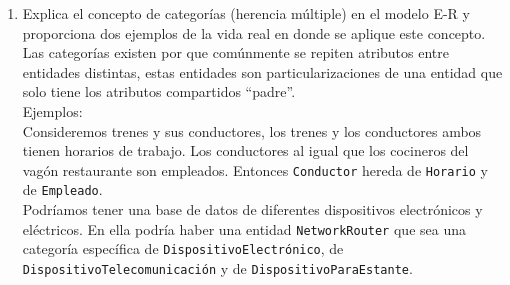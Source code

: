 \documentclass[12pt,a4paper]{article}
\begin{document}
\begin{enumerate}
\begin{enumerate}
			\item Explica el concepto de categorías (herencia múltiple) en el modelo E-R
				y proporciona dos ejemplos de la vida real en donde se aplique este concepto.\\

				Las categorías existen por que comúnmente se repiten atributos entre
				entidades distintas, estas entidades son particularizaciones de una entidad
				que solo tiene los atributos compartidos ``padre''.\\

				Ejemplos:\\
				Consideremos trenes y sus conductores, los trenes y los
				conductores ambos tienen horarios de trabajo. Los conductores
				al igual que los cocineros del vagón restaurante son empleados.
				Entonces \texttt{Conductor} hereda de \texttt{Horario} y de \texttt{Empleado}.\\

				Podríamos tener una base de datos de diferentes dispositivos electrónicos y eléctricos.
				En ella podría haber una entidad \texttt{NetworkRouter} que sea una categoría
				específica de \texttt{DispositivoElectrónico}, de \texttt{DispositivoTelecomunicación}
				y de \texttt{DispositivoParaEstante}.\\

		\end{enumerate}
\end{enumerate}
\end{document}
